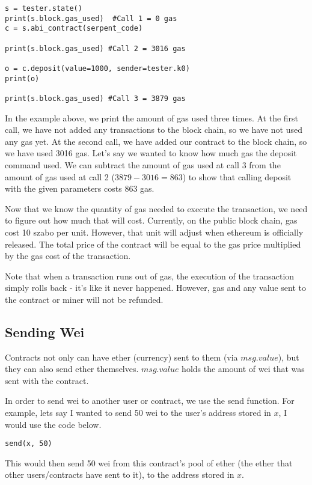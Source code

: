 \documentclass[12pt]{article}
\begin{document}
\begin{verbatim}
s = tester.state()
print(s.block.gas_used)  #Call 1 = 0 gas
c = s.abi_contract(serpent_code)

print(s.block.gas_used) #Call 2 = 3016 gas

o = c.deposit(value=1000, sender=tester.k0)
print(o)

print(s.block.gas_used) #Call 3 = 3879 gas
\end{verbatim}

In the example above, we print the amount of gas used three times. At the first call, we have not added any transactions to the block chain, so we have not used any gas yet. At the second call, we have added our contract to the block chain, so we have used 3016 gas. Let's say we wanted to know how much gas the deposit command used. We can subtract the amount of gas used at call 3 from the amount of gas used at call 2 ($3879-3016 = 863$) to show that calling deposit with the given parameters costs 863 gas. 

Now that we know the quantity of gas needed to execute the transaction, we need to figure out how much that will cost. Currently, on the public block chain, gas cost 10 szabo per unit. However, that unit will adjust when ethereum is officially released. The total price of the contract will be equal to the gas price multiplied by the gas cost of the transaction.

Note that when a transaction runs out of gas, the execution of the transaction simply rolls back - it's like it never happened. However, gas and any value sent to the contract or miner will not be refunded. \cite{Subtleties, WhatOptions}

\subsection{Sending Wei}
Contracts not only can have ether (currency) sent to them (via $msg.value$), but they can also send ether themselves. $msg.value$ holds the amount of wei that was sent with the contract.

In order to send wei to another user or contract, we use the send function. For example, lets say I wanted to send 50 wei to the user's address stored in $x$, I would use the code below.

\begin{verbatim}
send(x, 50)
\end{verbatim}

This would then send 50 wei from this contract's pool of ether (the ether that other users/contracts have sent to it), to the address stored in $x$.
\end{document}
